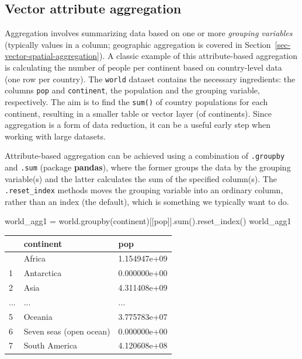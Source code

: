 \documentclass[
  letterpaper,
]{krantz}
\newenvironment{Shaded}{\begin{snugshade}}{\end{snugshade}}
\newcommand{\BuiltInTok}[1]{\textcolor[rgb]{0.00,0.23,0.31}{#1}}
\newcommand{\NormalTok}[1]{\textcolor[rgb]{0.00,0.23,0.31}{#1}}
\newcommand{\OperatorTok}[1]{\textcolor[rgb]{0.37,0.37,0.37}{#1}}
\newcommand{\StringTok}[1]{\textcolor[rgb]{0.13,0.47,0.30}{#1}}
\begin{document}
\subsection{Vector attribute
aggregation}\label{sec-vector-attribute-aggregation}

Aggregation involves summarizing data based on one or more
\emph{grouping variables} (typically values in a column; geographic
aggregation is covered in Section~\ref{sec-vector-spatial-aggregation}).
A classic example of this attribute-based aggregation is calculating the
number of people per continent based on country-level data (one row per
country). The \texttt{world} dataset contains the necessary ingredients:
the columns \texttt{pop} and \texttt{continent}, the population and the
grouping variable, respectively. The aim is to find the \texttt{sum()}
of country populations for each continent, resulting in a smaller table
or vector layer (of continents). Since aggregation is a form of data
reduction, it can be a useful early step when working with large
datasets.

Attribute-based aggregation can be achieved using a combination of
\texttt{.groupby} and \texttt{.sum} (package \textbf{pandas}), where the
former groups the data by the grouping variable(s) and the latter
calculates the sum of the specified column(s). The
\texttt{.reset\_index} methods moves the grouping variable into an
ordinary column, rather than an index (the default), which is something
we typically want to do.

\begin{Shaded}
\begin{Highlighting}[]
\NormalTok{world\_agg1 }\OperatorTok{=}\NormalTok{ world.groupby(}\StringTok{\textquotesingle{}continent\textquotesingle{}}\NormalTok{)[[}\StringTok{\textquotesingle{}pop\textquotesingle{}}\NormalTok{]].}\BuiltInTok{sum}\NormalTok{().reset\_index()}
\NormalTok{world\_agg1}
\end{Highlighting}
\end{Shaded}

\begin{longtable}[]{@{}lll@{}}
\toprule\noalign{}
& continent & pop \\
\midrule\noalign{}
\endhead
\bottomrule\noalign{}
\endlastfoot
0 & Africa & 1.154947e+09 \\
1 & Antarctica & 0.000000e+00 \\
2 & Asia & 4.311408e+09 \\
... & ... & ... \\
5 & Oceania & 3.775783e+07 \\
6 & Seven seas (open ocean) & 0.000000e+00 \\
7 & South America & 4.120608e+08 \\
\end{longtable}
\end{document}

